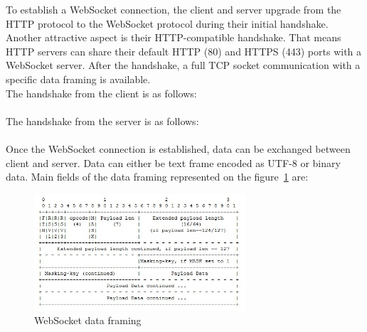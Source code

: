 \documentclass[pdftex,10pt,a4paper]{report}
\begin{document}
To establish a WebSocket connection, the client and server upgrade from the HTTP protocol to the WebSocket protocol during their initial handshake. Another attractive aspect is their HTTP-compatible handshake. That means HTTP servers can share their default HTTP (80) and HTTPS (443) ports with a WebSocket server. After the handshake, a full TCP socket communication with a specific data framing is available. \\

The handshake from the client is as follows: \\

\\


The handshake from the server is as follows: \\

 \\


Once the WebSocket connection is established, data can be exchanged between client and server. Data can either be text frame encoded as UTF-8 or binary data. Main fields of the data framing represented on the figure~\ref{WebSocket data framing} are:

\begin{figure}[h!]
		\centering
		\includegraphics[width=0.7\textwidth]{./frame_ws.jpg}
		\caption{WebSocket data framing}
		\label{WebSocket data framing}
\end{figure}
\end{document}
